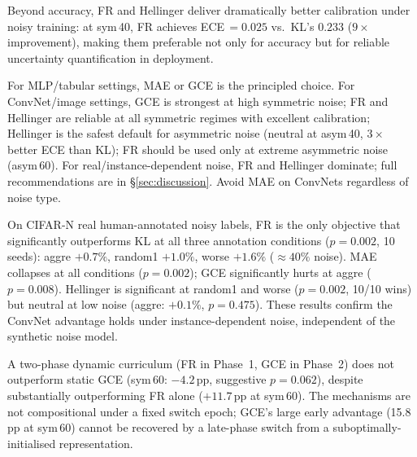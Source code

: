 \documentclass[11pt]{article}
\begin{document}
Beyond accuracy, FR and Hellinger deliver dramatically better calibration under
noisy training: at sym\,40, FR achieves ECE\,$=0.025$ vs.\ KL's $0.233$ ($9\times$
improvement), making them preferable not only for accuracy but for reliable uncertainty
quantification in deployment.

For MLP/tabular settings, MAE or GCE is the principled choice.
For ConvNet/image settings, GCE is strongest at high symmetric noise;
FR and Hellinger are reliable at all symmetric regimes with excellent calibration;
Hellinger is the safest default for asymmetric noise (neutral at asym\,40, $3\times$ better
ECE than KL); FR should be used only at extreme asymmetric noise (asym\,60).
For real/instance-dependent noise, FR and Hellinger dominate; full recommendations are in
\S\ref{sec:discussion}.
Avoid MAE on ConvNets regardless of noise type.

On CIFAR-N real human-annotated noisy labels, FR is the only objective that
significantly outperforms KL at all three annotation conditions ($p=0.002$,
10 seeds): aggre $+0.7\%$, random1 $+1.0\%$, worse $+1.6\%$ ($\approx 40\%$ noise).
MAE collapses at all conditions ($p=0.002$); GCE significantly hurts at aggre ($p=0.008$).
Hellinger is significant at random1 and worse ($p=0.002$, 10/10 wins) but neutral
at low noise (aggre: $+0.1\%$, $p=0.475$).
These results confirm the ConvNet advantage holds under instance-dependent noise,
independent of the synthetic noise model.

A two-phase dynamic curriculum (FR in Phase~1, GCE in Phase~2) does not outperform
static GCE (sym\,60: $-4.2$\,pp, suggestive $p=0.062$), despite substantially
outperforming FR alone ($+11.7$\,pp at sym\,60).
The mechanisms are not compositional under a fixed switch epoch; GCE's large
early advantage (15.8\,pp at sym\,60) cannot be recovered by a late-phase switch
from a suboptimally-initialised representation.
\end{document}
